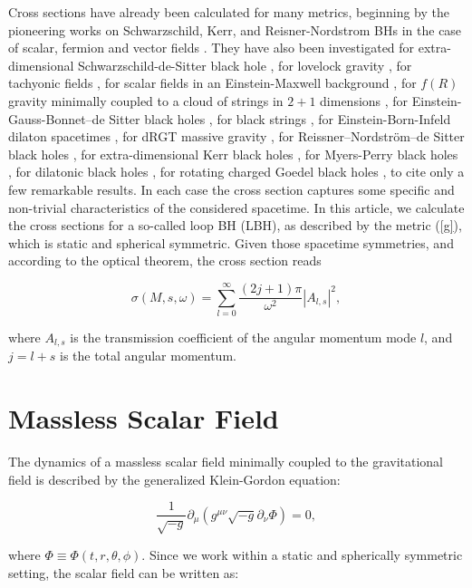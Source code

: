 \documentclass[twocolumn,amsmath,amssymb,prl,10pt,nofootinbib,superscriptaddress]{revtex4}
\def\be{\begin{equation}}
\def\ee{\end{equation}}
\begin{document}
Cross sections have already been calculated for many metrics, beginning by the pioneering works on  Schwarzschild, Kerr, and Reisner-Nordstrom BHs in the case of scalar, fermion and vector fields \cite{DNPagescalar, DNPagedirac, DNPagevector}. They have also been investigated for extra-dimensional Schwarzschild-de-Sitter black hole \cite{Kanti:2005ja}, for lovelock gravity \cite{Grain:2005my}, for tachyonic fields \cite{Gursel:2018bts}, for scalar fields in an Einstein-Maxwell background \cite{Panotopoulos:2018pvu}, for $f(R)$ gravity minimally coupled to a cloud of strings in $2+1$ dimensions \cite{Ovgun:2018gwt}, for Einstein-Gauss-Bonnet–de Sitter black holes \cite{Zhang:2017yfu}, for black strings \cite{Ahmed:2017edq}, for Einstein-Born-Infeld dilaton spacetimes \cite{Panotopoulos:2017yoe}, for dRGT massive gravity \cite{Boonserm:2017qcq}, for Reissner–Nordström–de Sitter black holes \cite{Ahmed:2016lou}, for extra-dimensional Kerr black holes \cite{Jorge:2014kra}, for Myers-Perry black holes \cite{Boonserm:2014fja}, for dilatonic black holes \cite{Abedi:2013xua}, for rotating charged Goedel black holes \cite{Li:2009zzf}, to cite only a few remarkable results. In each case the cross section captures some specific and non-trivial characteristics of the considered spacetime.
In this article, we calculate the cross sections for a so-called loop BH (LBH), as described by the metric (\ref{g}), which is static and spherical symmetric. Given those spacetime symmetries, and according to the optical theorem, the cross section reads

\be 
\sigma(M,s,\omega) = \sum_{l=0}^{ \infty} \frac{(2j+1) \pi}{\omega ^2} |A_{l,s} |^2,
\label{sigma}
\ee

\noindent where $A_{l,s} $ is the transmission coefficient of the angular momentum mode $l$, and $j=l+s$ is the total angular momentum. 


\section{Massless Scalar Field}

The dynamics of a massless scalar field minimally coupled to the gravitational field is described by the generalized Klein-Gordon equation:

\be
\frac{1}{\sqrt{-g}}\partial_{\mu} (g^{\mu \nu }\sqrt{-g}\partial_{\nu} \Phi)=0,
\label{kg}
\ee

\noindent where \textbf{ $\Phi \equiv \Phi(t,r, \theta, \phi)$}. Since we work within a static and spherically symmetric setting, the scalar field can be written as: 
\end{document}
